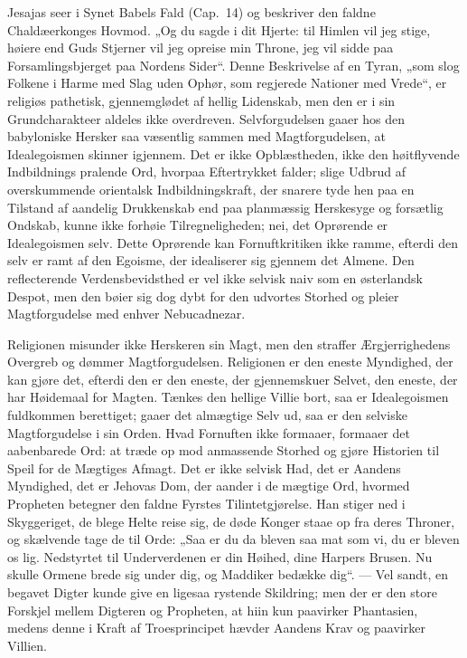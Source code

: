 \documentclass[12pt]{book}
\begin{document}
Jesajas seer i Synet Babels Fald (Cap.\ 14) og beskriver den faldne
Chaldæerkonges Hovmod. „Og du
sagde i dit Hjerte: til Himlen vil jeg stige, høiere end Guds
Stjerner vil jeg opreise min Throne, jeg vil sidde paa
Forsamlingsbjerget paa Nordens Sider“. Denne Beskrivelse af en
Tyran, „som slog Folkene i Harme med Slag uden Ophør, som regjerede
Nationer med Vrede“, er religiøs pathetisk, gjennemglødet af hellig
Lidenskab, men den er i sin Grundcharakteer aldeles ikke
overdreven. Selvforgudelsen gaaer hos den babyloniske Hersker saa
væsentlig sammen med Magtforgudelsen, at Idealegoismen skinner
igjennem. Det er ikke Opblæstheden, ikke den høitflyvende
Indbildnings pralende Ord, hvorpaa Eftertrykket falder; slige Udbrud
af overskummende orientalsk Indbildningskraft, der snarere tyde hen
paa en Tilstand af aandelig Drukkenskab end paa planmæssig
Herskesyge og forsætlig Ondskab, kunne ikke forhøie Tilregneligheden;
nei, det Oprørende er Idealegoismen selv. Dette Oprørende kan
Fornuftkritiken ikke ramme, efterdi den selv er ramt af den Egoisme,
der idealiserer sig gjennem det Almene. Den reflecterende
Verdensbevidsthed er vel ikke selvisk naiv som en østerlandsk
Despot, men den bøier sig dog dybt for den udvortes Storhed og
pleier Magtforgudelse med enhver Nebucadnezar.

Religionen misunder ikke Herskeren sin Magt, men den straffer
Ærgjerrighedens Overgreb og dømmer Magtforgudelsen. Religionen er
den eneste Myndighed, der kan gjøre det, efterdi den er den eneste,
der gjennemskuer Selvet, den eneste, der har Høidemaal for Magten.
Tænkes den hellige Villie bort, saa er Idealegoismen fuldkommen
berettiget; gaaer det almægtige Selv ud, saa er den selviske
Magtforgudelse i sin Orden. Hvad Fornuften ikke formaaer, formaaer
det aabenbarede Ord: at træde op mod anmassende Storhed og gjøre
Historien til Speil for de Mægtiges Afmagt. Det er ikke selvisk Had,
det er Aandens Myndighed, det er Jehovas Dom, der aander i de
mægtige Ord, hvormed Propheten betegner
den faldne Fyrstes Tilintetgjørelse. Han stiger ned i Skyggeriget,
de blege Helte reise sig, de døde Konger staae op fra deres Throner,
og skælvende tage de til Orde: „Saa er du da bleven saa mat som vi,
du er bleven os lig. Nedstyrtet til Underverdenen er din Høihed,
dine Harpers Brusen. Nu skulle Ormene brede sig under dig, og
Maddiker bedække dig“. --- Vel sandt, en begavet Digter kunde give
en ligesaa rystende Skildring; men der er den store Forskjel mellem
Digteren og Propheten, at hiin kun paavirker Phantasien, medens
denne i Kraft af Troesprincipet hævder Aandens Krav og paavirker
Villien.
\end{document}
